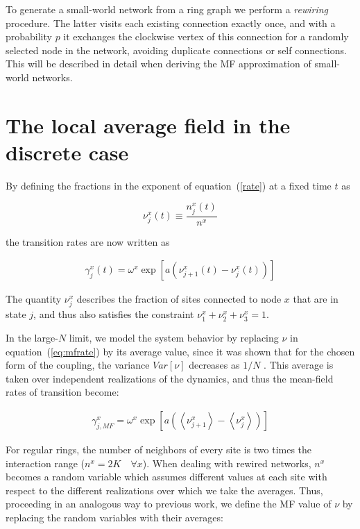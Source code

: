 To generate a small-world network from a ring graph we perform a \textit{rewiring} procedure. The latter visits each existing
connection exactly once, and with a probability $p$ it exchanges the clockwise vertex of this connection for a randomly selected node
in the network, avoiding duplicate connections or self connections. This will be described in detail when deriving the MF approximation
of small-world networks.

\section{The local average field in the discrete case}

By defining the fractions in the exponent of equation~(\ref{rate}) at a fixed time $t$ as

\begin{equation}
    \nu^x_j(t) \equiv \frac{n^x_j(t)}{n^x}
\end{equation}

\noindent the transition rates are now written as

\begin{align}
    \gamma^x_j(t) = \omega^x\exp\left[ a(\nu^x_{j+1}(t) - \nu^x_j(t)) \right]
    \label{eq:mfrate}
\end{align}

The quantity $\nu^x_j$ describes the fraction of sites connected to node $x$ that are in state $j$, and thus also satisfies the
constraint $\nu^x_1+\nu^x_2+\nu^x_3=1$.

In the large-$N$ limit, we model the system behavior by replacing $\nu$ in equation~(\ref{eq:mfrate}) by its average value, since it
was shown that for the chosen form of the coupling, the variance $Var[\nu]$ decreases as $1/N$ \cite{escaff2014arrays}. This average is
taken over independent realizations of the dynamics, and thus the mean-field rates of transition become:

\begin{align}
    \gamma^x_{j,MF} = \omega^x \exp \left[ a \left( \left< \nu^x_{j+1} \right> - \left< \nu^x_j \right> \right) \right]
    \label{gammaMF}
\end{align}

For regular rings, the number of neighbors of every site is two times the interaction range ($n^x = 2K \quad \forall x$). When dealing
with rewired networks, $n^x$ becomes a random variable which assumes different values at each site with respect to the different
realizations over which we take the averages. Thus, proceeding in an analogous way to previous work, we define the MF value of $\nu$ by
replacing the random variables with their averages:


